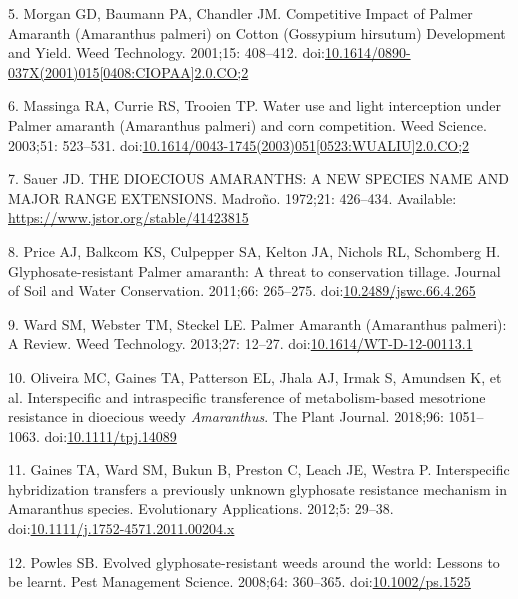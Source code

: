 \documentclass[10pt,letterpaper]{article}
\begin{document}
\leavevmode\hypertarget{ref-morgan_competitive_2001}{}%
5. Morgan GD, Baumann PA, Chandler JM. Competitive Impact of Palmer
Amaranth (Amaranthus palmeri) on Cotton (Gossypium hirsutum) Development
and Yield. Weed Technology. 2001;15: 408--412.
doi:\href{https://doi.org/10.1614/0890-037X(2001)015\%5B0408:CIOPAA\%5D2.0.CO;2}{10.1614/0890-037X(2001)015{[}0408:CIOPAA{]}2.0.CO;2}

\leavevmode\hypertarget{ref-massinga_water_2003}{}%
6. Massinga RA, Currie RS, Trooien TP. Water use and light interception
under Palmer amaranth (Amaranthus palmeri) and corn competition. Weed
Science. 2003;51: 523--531.
doi:\href{https://doi.org/10.1614/0043-1745(2003)051\%5B0523:WUALIU\%5D2.0.CO;2}{10.1614/0043-1745(2003)051{[}0523:WUALIU{]}2.0.CO;2}

\leavevmode\hypertarget{ref-sauer_dioecious_1972}{}%
7. Sauer JD. THE DIOECIOUS AMARANTHS: A NEW SPECIES NAME AND MAJOR RANGE
EXTENSIONS. Madroño. 1972;21: 426--434. Available:
\url{https://www.jstor.org/stable/41423815}

\leavevmode\hypertarget{ref-price_glyphosate-resistant_2011}{}%
8. Price AJ, Balkcom KS, Culpepper SA, Kelton JA, Nichols RL, Schomberg
H. Glyphosate-resistant Palmer amaranth: A threat to conservation
tillage. Journal of Soil and Water Conservation. 2011;66: 265--275.
doi:\href{https://doi.org/10.2489/jswc.66.4.265}{10.2489/jswc.66.4.265}

\leavevmode\hypertarget{ref-ward_palmer_2013}{}%
9. Ward SM, Webster TM, Steckel LE. Palmer Amaranth (Amaranthus
palmeri): A Review. Weed Technology. 2013;27: 12--27.
doi:\href{https://doi.org/10.1614/WT-D-12-00113.1}{10.1614/WT-D-12-00113.1}

\leavevmode\hypertarget{ref-oliveira_interspecific_2018}{}%
10. Oliveira MC, Gaines TA, Patterson EL, Jhala AJ, Irmak S, Amundsen K,
et al. Interspecific and intraspecific transference of metabolism-based
mesotrione resistance in dioecious weedy \emph{Amaranthus}. The Plant
Journal. 2018;96: 1051--1063.
doi:\href{https://doi.org/10.1111/tpj.14089}{10.1111/tpj.14089}

\leavevmode\hypertarget{ref-gaines_interspecific_2012}{}%
11. Gaines TA, Ward SM, Bukun B, Preston C, Leach JE, Westra P.
Interspecific hybridization transfers a previously unknown glyphosate
resistance mechanism in Amaranthus species. Evolutionary Applications.
2012;5: 29--38.
doi:\href{https://doi.org/10.1111/j.1752-4571.2011.00204.x}{10.1111/j.1752-4571.2011.00204.x}

\leavevmode\hypertarget{ref-powles_evolved_2008}{}%
12. Powles SB. Evolved glyphosate-resistant weeds around the world:
Lessons to be learnt. Pest Management Science. 2008;64: 360--365.
doi:\href{https://doi.org/10.1002/ps.1525}{10.1002/ps.1525}
\end{document}
